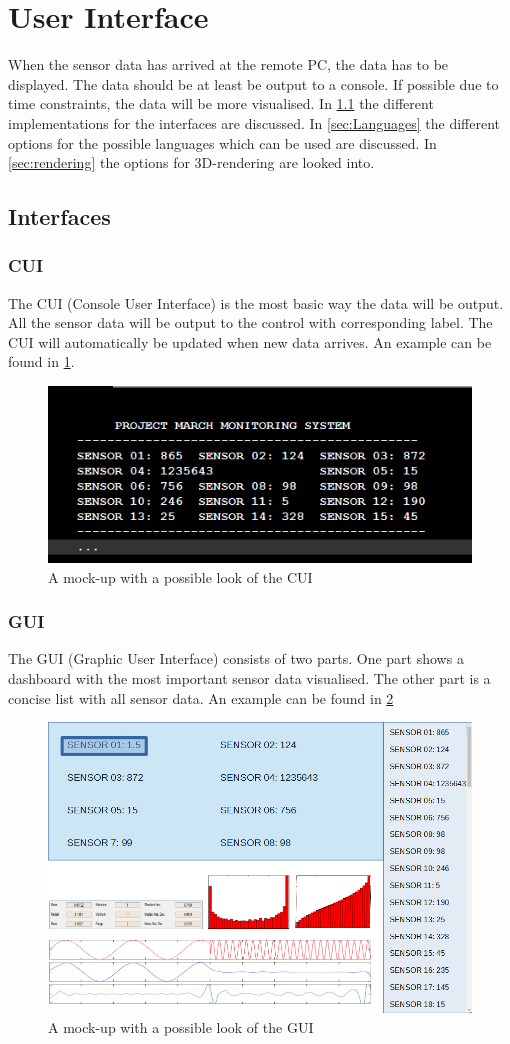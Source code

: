 \section{User Interface}\label{sec:ui}
When the sensor data has arrived at the remote PC, the data has to be displayed. The data should be at least be output to a console. If possible due to time constraints, the data will be more visualised. In \ref{sec: Interfaces} the different implementations for the interfaces are discussed. In \ref{sec:Languages} the different options for the possible languages which can be used are discussed. In \ref{sec:rendering} the options for 3D-rendering are looked into.
\subsection{Interfaces}\label{sec: Interfaces}
\subsubsection{CUI}
The CUI (Console User Interface) is the most basic way the data will be output. All the sensor data will be output to the control with corresponding label. The CUI will automatically be updated when new data arrives. An example can be found in \ref{fig:CUI}.
\begin{figure}[H]
	\centering
	\includegraphics[width=.75\textwidth]{research/MockupCUI}
	\caption{A mock-up with a possible look of the CUI} 
	\label{fig:CUI}
\end{figure} 
\subsubsection{GUI}
The GUI (Graphic User Interface) consists of two parts. One part shows a dashboard with the most important sensor data visualised. The other part is a concise list with all sensor data. An example can be found in \ref{fig:GUI}  
\begin{figure}[H]
	\centering
	\includegraphics[width=.75\textwidth]{research/MockupGUI}
	\caption{A mock-up with a possible look of the GUI} 
	\label{fig:GUI}
\end{figure} 
